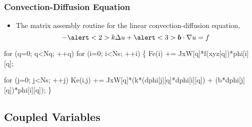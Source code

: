 \begin{frame}[fragile]  %
  \frametitle{Convection-Diffusion Equation}
	\begin{block}{}
	  \begin{itemize}    
	  \item{The matrix assembly routine for the linear convection-diffusion equation,
	    \begin{equation}
	      \nonumber
	      -\alert<2>{k}\Delta u + \alert<3>{\bv{b} \cdot \nabla u} = f
	    \end{equation}
	  }
	  \end{itemize}
	\end{block}
\small
\begin{semiverbatim}
for (q=0; q<Nq; ++q) 
  for (i=0; i<Ns; ++i) \{
    Fe(i)   += JxW[q]*f(xyz[q])*phi[i][q];
    
    for (j=0; j<Ns; ++j)
      Ke(i,j) += JxW[q]*(\alert<2>{k}*(dphi[j][q]*dphi[i][q]) 
                      + (\alert<3>{b*dphi[j][q]})*phi[i][q]);
  \}
\end{semiverbatim}
\end{frame}

\subsection{Coupled Variables}

